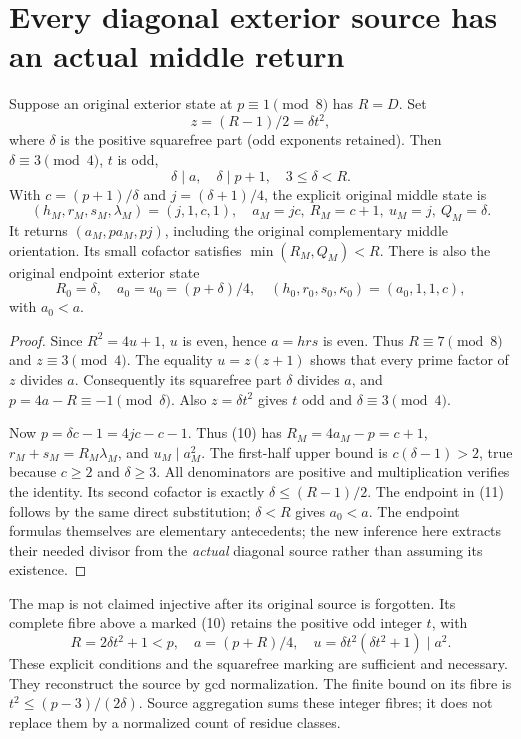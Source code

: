 \section{Every diagonal exterior source has an actual middle return}
\begin{theorem}\label{thm:collision}
Suppose an original exterior state at $p\equiv1\pmod8$ has $R=D$.
Set
\[
 z=(R-1)/2=\delta t^2,
\]
where $\delta$ is the positive squarefree part (odd exponents retained).
Then $\delta\equiv3\pmod4$, $t$ is odd,
\[
 \delta\mid a,\quad \delta\mid p+1,\quad 3\le\delta<R.
\]
With $c=(p+1)/\delta$ and $j=(\delta+1)/4$, the explicit original middle state is
\[
 \boxed{(h_M,r_M,s_M,\lambda_M)=(j,1,c,1),\quad
 a_M=jc,\ R_M=c+1,\ u_M=j,\ Q_M=\delta.}                 \tag{10}
\]
It returns $(a_M,pa_M,pj)$, including the original complementary middle
orientation. Its small cofactor satisfies $\min(R_M,Q_M)<R$.
There is also the original endpoint exterior state
\[
 R_0=\delta,\quad a_0=u_0=(p+\delta)/4,\quad
 (h_0,r_0,s_0,\kappa_0)=(a_0,1,1,c),                    \tag{11}
\]
with $a_0<a$.
\end{theorem}
\begin{proof}
Since $R^2=4u+1$, $u$ is even, hence $a=hrs$ is even. Thus $R\equiv7\pmod8$
and $z\equiv3\pmod4$. The equality $u=z(z+1)$ shows that every prime factor of
$z$ divides $a$. Consequently its squarefree part $\delta$ divides $a$, and
$p=4a-R\equiv-1\pmod\delta$. Also $z=\delta t^2$ gives $t$ odd and
$\delta\equiv3\pmod4$.

Now $p=\delta c-1=4jc-c-1$. Thus (10) has $R_M=4a_M-p=c+1$,
$r_M+s_M=R_M\lambda_M$, and $u_M\mid a_M^2$.
The first-half upper bound is $c(\delta-1)>2$, true because $c\ge2$ and
$\delta\ge3$. All denominators are positive and multiplication verifies the
identity. Its second cofactor is exactly $\delta\le(R-1)/2$.
The endpoint in (11) follows by the same direct substitution; $\delta<R$
gives $a_0<a$. The endpoint formulas themselves are elementary antecedents;
the new inference here extracts their needed divisor from the \emph{actual}
diagonal source rather than assuming its existence.
\end{proof}

The map is not claimed injective after its original source is forgotten.
Its complete fibre above a marked (10) retains the positive odd integer $t$, with
\[
 R=2\delta t^2+1<p,\quad a=(p+R)/4,\quad
 u=\delta t^2(\delta t^2+1)\mid a^2.                      \tag{12}
\]
These explicit conditions and the squarefree marking are sufficient and necessary.
They reconstruct the source by gcd normalization. The finite bound on its fibre is
$t^2\le(p-3)/(2\delta)$. Source aggregation sums these integer fibres; it does
not replace them by a normalized count of residue classes.

